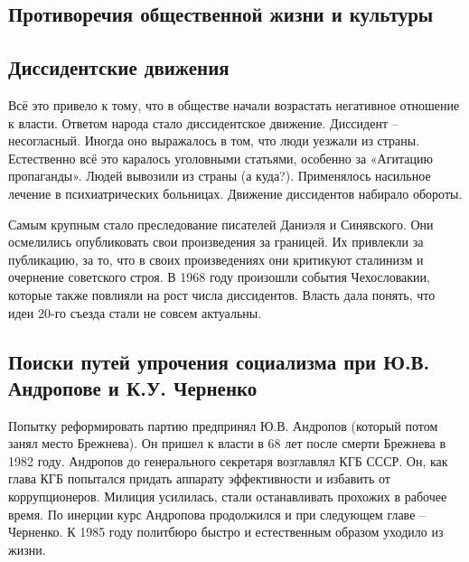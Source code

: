 \subsection{Противоречия общественной жизни и культуры}



\subsection{Диссидентские движения}

Всё это привело к тому, что в обществе начали возрастать негативное отношение к власти. Ответом народа стало диссидентское движение. Диссидент – несогласный. Иногда оно выражалось в том, что люди уезжали из страны. Естественно всё это каралось уголовными статьями, особенно за «Агитацию пропаганды». Людей вывозили из страны (а куда?). Применялось насильное лечение в психиатрических больницах. 
Движение диссидентов набирало обороты. 


Самым крупным стало преследование писателей Даниэля и Синявского. Они осмелились опубликовать свои произведения за границей. Их привлекли за публикацию, за то, что в своих произведениях они критикуют сталинизм и очернение советского строя. В 1968 году произошли события Чехословакии, которые также повлияли на рост числа диссидентов. Власть дала понять, что идеи 20-го съезда стали не совсем актуальны.

\subsection{Поиски путей упрочения социализма при Ю.В. Андропове и К.У. Черненко}

Попытку реформировать партию предпринял Ю.В. Андропов (который потом занял место Брежнева). 
Он пришел к власти в 68 лет после смерти Брежнева в 1982 году. Андропов до генерального секретаря возглавлял КГБ СССР. Он, как глава КГБ попытался придать аппарату эффективности и избавить от коррупционеров. Милиция усилилась, стали останавливать прохожих в рабочее время. По инерции курс Андропова продолжился и при следующем главе – Черненко. К 1985 году политбюро быстро и естественным образом уходило из жизни.
